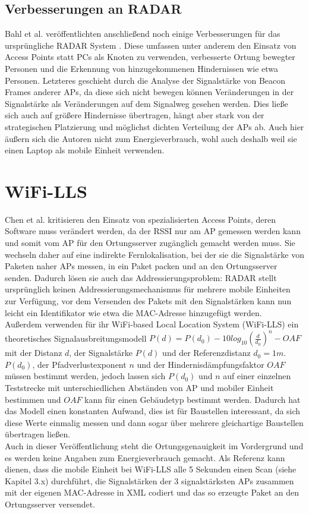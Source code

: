 \subsection{Verbesserungen an RADAR}
Bahl et al. veröffentlichten anschließend noch einige Verbesserungen für das ursprüngliche RADAR System \cite{bahl2000enhancements}.
Diese umfassen unter anderem den Einsatz von Access Points statt PCs als Knoten zu verwenden, verbesserte Ortung bewegter Personen und die Erkennung von hinzugekommenen Hindernissen wie etwa Personen.
Letzteres geschieht durch die Analyse der Signalstärke von Beacon Frames anderer APs, da diese sich nicht bewegen können Veränderungen in der Signalstärke als Veränderungen auf dem Signalweg gesehen werden.
Dies ließe sich auch auf größere Hindernisse übertragen, hängt aber stark von der strategischen Platzierung und möglichst dichten Verteilung der APs ab.
Auch hier äußern sich die Autoren nicht zum Energieverbrauch, wohl auch deshalb weil sie einen Laptop als mobile Einheit verwenden.


\section{WiFi-LLS}
\label{ch:Vorherige:sec:LLS}
Chen et al. kritisieren den Einsatz von spezialisierten Access Points, deren Software muss verändert werden, da der RSSI nur am AP gemessen werden kann und somit vom AP für den Ortungsserver zugänglich gemacht werden muss. 
Sie wechseln daher auf eine indirekte Fernlokalisation, bei der sie die Signalstärke von Paketen naher APs messen, in ein Paket packen und an den Ortungsserver senden. 
Dadurch lösen sie auch das Addressierungsproblem: RADAR stellt ursprünglich keinen Addressierungsmechanismus für mehrere mobile Einheiten zur Verfügung, vor dem Versenden des Pakets mit den Signalstärken kann nun leicht ein Identifikator wie etwa die MAC-Adresse hinzugefügt werden.\\
Außerdem verwenden für ihr WiFi-based Local Location System (WiFi-LLS) ein theoretisches Signalausbreitungsmodell $P(d) = P(d_0) - 10log_{10}(\frac{d}{d_0})^n - OAF$ mit der Distanz $d$, der Signalstärke $P(d)$ und der Referenzdistanz $d_0 = 1m$. 
$P(d_0)$, der Pfadverlustexponent $n$ und der Hindernisdämpfungsfaktor $OAF$ müssen bestimmt werden, jedoch lassen sich $P(d_0)$ und $n$ auf einer einzelnen Teststrecke mit unterschiedlichen Abständen von AP und mobiler Einheit bestimmen und $OAF$ kann für einen Gebäudetyp bestimmt werden.
Dadurch hat das Modell einen konstanten Aufwand, dies ist für Baustellen interessant, da sich diese Werte einmalig messen und dann sogar über mehrere gleichartige Baustellen übertragen ließen.\\
Auch in dieser Veröffentlichung steht die Ortungsgenauigkeit im Vordergrund und es werden keine Angaben zum Energieverbrauch gemacht. 
Als Referenz kann dienen, dass die mobile Einheit bei WiFi-LLS alle 5 Sekunden einen Scan (siehe Kapitel 3.x) durchführt, die Signalstärken der 3 signalstärksten APs zusammen mit der eigenen MAC-Adresse in XML codiert und das so erzeugte Paket an den Ortungsserver versendet.

